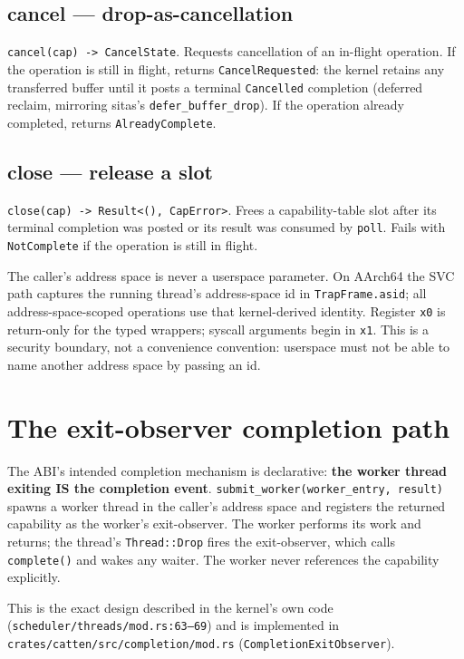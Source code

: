 \subsection{cancel --- drop-as-cancellation}

\texttt{cancel(cap) -> CancelState}. Requests cancellation of an
in-flight operation. If the operation is still in flight, returns
\texttt{CancelRequested}: the kernel retains any transferred buffer until
it posts a terminal \texttt{Cancelled} completion (deferred reclaim,
mirroring sitas's \texttt{defer\_buffer\_drop}). If the operation already
completed, returns \texttt{AlreadyComplete}.

\subsection{close --- release a slot}

\texttt{close(cap) -> Result<(), CapError>}. Frees a capability-table
slot after its terminal completion was posted or its result was consumed by
\texttt{poll}. Fails with \texttt{NotComplete} if the operation is still in
flight.

The caller's address space is never a userspace parameter. On AArch64 the SVC
path captures the running thread's address-space id in \texttt{TrapFrame.asid};
all address-space-scoped operations use that kernel-derived identity. Register
\texttt{x0} is return-only for the typed wrappers; syscall arguments begin in
\texttt{x1}. This is a security boundary, not a convenience convention:
userspace must not be able to name another address space by passing an id.

\section{The exit-observer completion path}

The ABI's intended completion mechanism is declarative: \textbf{the worker
thread exiting IS the completion event}. \texttt{submit\_worker(worker\_entry,
result)} spawns a worker thread in the caller's address space and registers the returned
capability as the worker's exit-observer. The worker performs its work and
returns; the thread's \texttt{Thread::Drop} fires the exit-observer, which
calls \texttt{complete()} and wakes any waiter. The worker never references
the capability explicitly.

This is the exact design described in the kernel's own code
(\texttt{scheduler/threads/mod.rs:63--69}) and is implemented in
\texttt{crates/catten/src/completion/mod.rs} (\texttt{CompletionExitObserver}).

